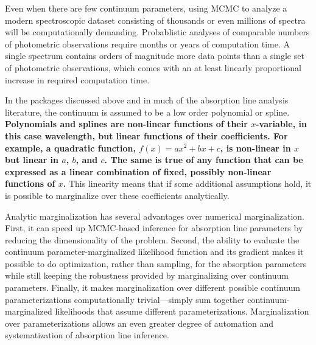 \documentclass[trackchanges]{aastex62}
\begin{document}
Even when there are few continuum parameters, using MCMC to analyze a modern spectroscopic dataset consisting of thousands or even millions of spectra will be computationally demanding.
Probablistic analyses of comparable numbers of photometric observations \citep[e.g.][]{2015ApJ...810...25G,2016ApJ...826..104G} require months or years of computation time.
A single spectrum contains orders of magnitude more data points than a single set of photometric observations, which comes with an at least linearly proportional increase in required computation time.

In the packages discussed above and in much of the absorption line analysis literature, the continuum is assumed to be a low order polynomial or spline.
{\color{red}\bf Polynomials and splines are non-linear functions of their $x$-variable, in this case wavelength, but linear functions of their coefficients.
For example, a quadratic function, $f(x) = a x^2 + b x + c$, is non-linear in $x$ but linear in $a$, $b$, and $c$.
The same is true of any function that can be expressed as a linear combination of fixed, possibly non-linear functions of $x$.}
This linearity means that if some additional assumptions hold, it is possible to marginalize over these coefficients analytically.

Analytic marginalization has several advantages over numerical marginalization.
First, it can speed up MCMC-based inference for absorption line parameters by reducing the dimensionality of the problem.
Second, the ability to evaluate the continuum parameter-marginalized likelihood function and its gradient makes it possible to do optimization, rather than sampling, for the absorption parameters while still keeping the robustness provided by marginalizing over continuum parameters.
Finally, it makes marginalization over different possible continuum parameterizations computationally trivial---simply sum together continuum-marginalized likelihoods that assume different parameterizations.
Marginalization over parameterizations allows an even greater degree of automation and systematization of absorption line inference.
\end{document}
